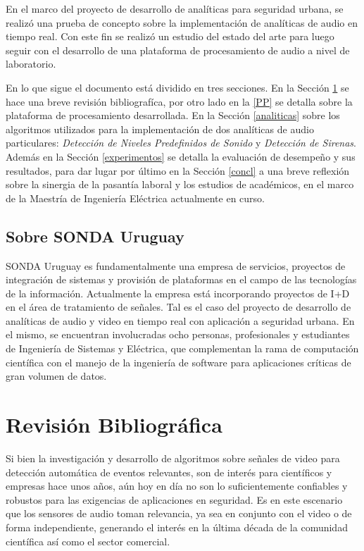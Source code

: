 \documentclass{article}
\begin{document}
\bigskip
En el marco del proyecto de desarrollo de analíticas para seguridad urbana, se realizó una prueba de concepto sobre la implementación de analíticas de audio en tiempo real. Con este fin se realizó un estudio del estado del arte para luego seguir con el desarrollo de una plataforma de procesamiento de audio a nivel de laboratorio. 

\bigskip
En lo que sigue el documento está dividido en tres secciones. En la Sección \ref{literatura} se hace una breve revisión bibliografíca, por otro lado en la \ref{PP} se detalla sobre la plataforma de procesamiento desarrollada. En la Sección \ref{analiticas} sobre los algoritmos utilizados para la implementación de dos analíticas de audio particulares: \textit{Detección de Niveles Predefinidos de Sonido} y \textit{Detección de Sirenas}. Además en la Sección \ref{experimentos} se detalla la evaluación de desempeño y sus resultados, para dar lugar por último en la Sección \ref{concl} a una breve reflexión sobre la sinergia de la pasantía laboral y los estudios de académicos, en el marco de la Maestría de Ingeniería Eléctrica actualmente en curso.  

\subsection{Sobre SONDA Uruguay}
SONDA Uruguay es fundamentalmente una empresa de servicios, proyectos de integración de sistemas y provisión de plataformas en el campo de las tecnologías de la información. Actualmente la empresa está incorporando proyectos de I+D en el área de tratamiento de señales. Tal es el caso del proyecto de desarrollo de analíticas de audio y video en tiempo real con aplicación a seguridad urbana. En el mismo, se encuentran involucradas ocho personas, profesionales y estudiantes de Ingeniería de Sistemas y Eléctrica, que complementan la rama de computación científica con el manejo de la ingeniería de software para aplicaciones críticas de gran volumen de datos.  


\section{Revisión Bibliográfica}
\label{literatura}
Si bien la investigación y desarrollo de algoritmos sobre señales de video para detección automática de eventos relevantes, son de interés para científicos y empresas hace unos años, aún hoy en día no son lo suficientemente confiables y robustos para las exigencias de aplicaciones en seguridad. Es en este escenario que los sensores de audio toman relevancia, ya sea en conjunto con el video o de forma independiente, generando el interés en la última década de la comunidad científica así como el sector comercial. 
\end{document}
